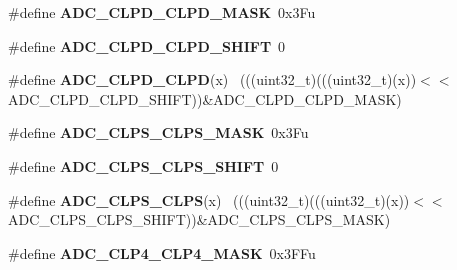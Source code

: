 \begin{DoxyCompactItemize}
\item 
\hypertarget{group___a_d_c___register___masks_gaae8d6090ede9d73497ae3e0b4fa2c6cd}{}\#define {\bfseries A\+D\+C\+\_\+\+C\+L\+P\+D\+\_\+\+C\+L\+P\+D\+\_\+\+M\+A\+S\+K}~0x3\+Fu\label{group___a_d_c___register___masks_gaae8d6090ede9d73497ae3e0b4fa2c6cd}

\item 
\hypertarget{group___a_d_c___register___masks_ga14a354b0de262fc93f30472e99bbe9bc}{}\#define {\bfseries A\+D\+C\+\_\+\+C\+L\+P\+D\+\_\+\+C\+L\+P\+D\+\_\+\+S\+H\+I\+F\+T}~0\label{group___a_d_c___register___masks_ga14a354b0de262fc93f30472e99bbe9bc}

\item 
\hypertarget{group___a_d_c___register___masks_gaa6303d44f58e5fdb2c1211b5afdd9dd4}{}\#define {\bfseries A\+D\+C\+\_\+\+C\+L\+P\+D\+\_\+\+C\+L\+P\+D}(x)                                              ~(((uint32\+\_\+t)(((uint32\+\_\+t)(x))$<$$<$A\+D\+C\+\_\+\+C\+L\+P\+D\+\_\+\+C\+L\+P\+D\+\_\+\+S\+H\+I\+F\+T))\&A\+D\+C\+\_\+\+C\+L\+P\+D\+\_\+\+C\+L\+P\+D\+\_\+\+M\+A\+S\+K)\label{group___a_d_c___register___masks_gaa6303d44f58e5fdb2c1211b5afdd9dd4}

\item 
\hypertarget{group___a_d_c___register___masks_gaccedf61066feb0b1c6d6bd7794d2a79c}{}\#define {\bfseries A\+D\+C\+\_\+\+C\+L\+P\+S\+\_\+\+C\+L\+P\+S\+\_\+\+M\+A\+S\+K}~0x3\+Fu\label{group___a_d_c___register___masks_gaccedf61066feb0b1c6d6bd7794d2a79c}

\item 
\hypertarget{group___a_d_c___register___masks_ga94f5e6c337622e8c4b8d03201e1c2d11}{}\#define {\bfseries A\+D\+C\+\_\+\+C\+L\+P\+S\+\_\+\+C\+L\+P\+S\+\_\+\+S\+H\+I\+F\+T}~0\label{group___a_d_c___register___masks_ga94f5e6c337622e8c4b8d03201e1c2d11}

\item 
\hypertarget{group___a_d_c___register___masks_ga41a46959a24ace39179d4305e102e44d}{}\#define {\bfseries A\+D\+C\+\_\+\+C\+L\+P\+S\+\_\+\+C\+L\+P\+S}(x)                                              ~(((uint32\+\_\+t)(((uint32\+\_\+t)(x))$<$$<$A\+D\+C\+\_\+\+C\+L\+P\+S\+\_\+\+C\+L\+P\+S\+\_\+\+S\+H\+I\+F\+T))\&A\+D\+C\+\_\+\+C\+L\+P\+S\+\_\+\+C\+L\+P\+S\+\_\+\+M\+A\+S\+K)\label{group___a_d_c___register___masks_ga41a46959a24ace39179d4305e102e44d}

\item 
\hypertarget{group___a_d_c___register___masks_ga877d163ca4067627ebb29125d75eb757}{}\#define {\bfseries A\+D\+C\+\_\+\+C\+L\+P4\+\_\+\+C\+L\+P4\+\_\+\+M\+A\+S\+K}~0x3\+F\+Fu\label{group___a_d_c___register___masks_ga877d163ca4067627ebb29125d75eb757}


\end{DoxyCompactItemize}
